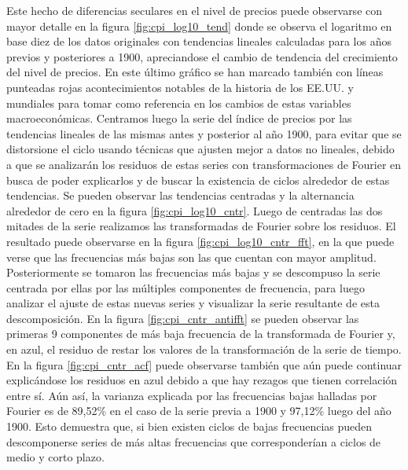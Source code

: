 \documentclass[a4paper]{article}
\begin{document}
Este hecho de diferencias seculares en el nivel de precios puede observarse con mayor detalle en la figura \ref{fig:cpi_log10_tend} donde se observa el logaritmo en base diez de los datos originales con tendencias lineales calculadas para los años previos y posteriores a 1900, apreciandose el cambio de tendencia del crecimiento del nivel de precios. En este último gráfico se han marcado también con líneas punteadas rojas acontecimientos notables de la historia de los EE.UU. y mundiales para tomar como referencia en los cambios de estas variables macroeconómicas.
Centramos luego la serie del índice de precios por las tendencias lineales de las mismas antes y posterior al año 1900, para evitar que se distorsione el ciclo usando técnicas que ajusten mejor a datos no lineales, debido a que se analizarán los residuos de estas series con transformaciones de Fourier en busca de poder explicarlos y de buscar la existencia de ciclos alrededor de estas tendencias. Se pueden observar las tendencias centradas y la alternancia alrededor de cero en la figura \ref{fig:cpi_log10_cntr}.
Luego de centradas las dos mitades de la serie realizamos las transformadas de Fourier sobre los residuos. El resultado puede observarse en la figura \ref{fig:cpi_log10_cntr_fft}, en la que puede verse que las frecuencias más bajas son las que cuentan con mayor amplitud. Posteriormente se tomaron las frecuencias más bajas y se descompuso la serie centrada por ellas por las múltiples componentes de frecuencia, para luego analizar el ajuste de estas nuevas series y visualizar la serie resultante de esta descomposición. En la figura \ref{fig:cpi_cntr_antifft} se pueden observar las primeras 9 componentes de más baja frecuencia de la transformada de Fourier y, en azul, el residuo de restar los valores de la transformación de la serie de tiempo. En la figura \ref{fig:cpi_cntr_acf} puede observarse también que aún puede continuar explicándose los residuos en azul debido a que hay rezagos que tienen correlación entre sí. Aún así, la varianza explicada por las frecuencias bajas halladas por Fourier es de 89,52\% en el caso de la serie previa a 1900 y 97,12\% luego del año 1900. Esto demuestra que, si bien existen ciclos de bajas frecuencias pueden descomponerse series de más altas frecuencias que corresponderían a ciclos de medio y corto plazo.
\end{document}
